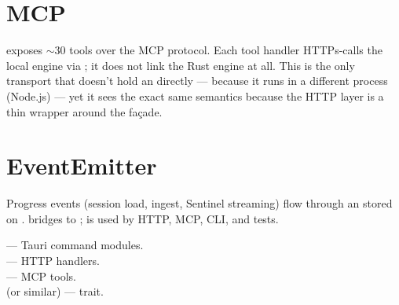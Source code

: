 \section{MCP}

 exposes $\sim$30 tools
over the MCP protocol. Each tool handler HTTPs-calls the local
engine via ; it does not link the
Rust engine at all. This is the only transport that doesn't hold
an  directly --- because it runs in a
different process (Node.js) --- yet it sees the exact same
semantics because the HTTP layer is a thin wrapper around the
façade.

\section{EventEmitter}

Progress events (session load, ingest, Sentinel streaming) flow
through an  stored on .
 bridges to ;
 is used by HTTP, MCP, CLI, and tests.

\begin{inthecode}
 --- Tauri command modules.\\
 --- HTTP handlers.\\
 --- MCP tools.\\
 (or similar) ---
 trait.
\end{inthecode}
